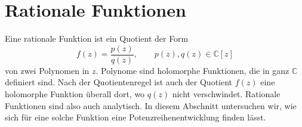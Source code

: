 %
%
%
\section{Rationale Funktionen
\label{buch:analytisch:section:rational}}
Eine rationale Funktion ist ein Quotient der Form
\[
f(z)
=
\frac{p(z)}{q(z)},
\qquad
p(z),q(z)\in\mathbb{C}[z]
\]
von zwei Polynomen in $z$.
Polynome sind holomorphe Funktionen, die in ganz $\mathbb{C}$
definiert sind.
Nach der Quotientenregel ist auch der Quotient $f(z)$ eine holomorphe
Funktion überall dort, wo $q(z)$ nicht verschwindet.
Rationale Funktionen sind also auch analytisch.
In diesem Abschnitt untersuchen wir, wie sich für eine solche Funktion
eine Potenzreihenentwicklung finden lässt.




